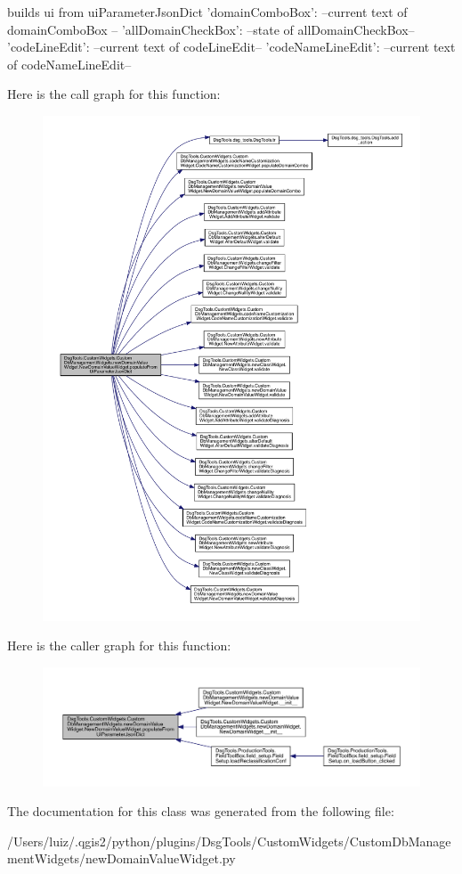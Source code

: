 \begin{DoxyVerb}builds ui from uiParameterJsonDict
{
    'domainComboBox': --current text of domainComboBox --
    'allDomainCheckBox': --state of allDomainCheckBox--
    'codeLineEdit': --current text of codeLineEdit--
    'codeNameLineEdit': --current text of codeNameLineEdit--
}
\end{DoxyVerb}
 Here is the call graph for this function\+:
\nopagebreak
\begin{figure}[H]
\begin{center}
\leavevmode
\includegraphics[width=350pt]{class_dsg_tools_1_1_custom_widgets_1_1_custom_db_management_widgets_1_1new_domain_value_widget_1_1_new_domain_value_widget_a31323073d45b18bb4f984536794a63ba_cgraph}
\end{center}
\end{figure}
Here is the caller graph for this function\+:
\nopagebreak
\begin{figure}[H]
\begin{center}
\leavevmode
\includegraphics[width=350pt]{class_dsg_tools_1_1_custom_widgets_1_1_custom_db_management_widgets_1_1new_domain_value_widget_1_1_new_domain_value_widget_a31323073d45b18bb4f984536794a63ba_icgraph}
\end{center}
\end{figure}


The documentation for this class was generated from the following file\+:\begin{DoxyCompactItemize}
\item 
/\+Users/luiz/.\+qgis2/python/plugins/\+Dsg\+Tools/\+Custom\+Widgets/\+Custom\+Db\+Management\+Widgets/new\+Domain\+Value\+Widget.\+py\end{DoxyCompactItemize}
